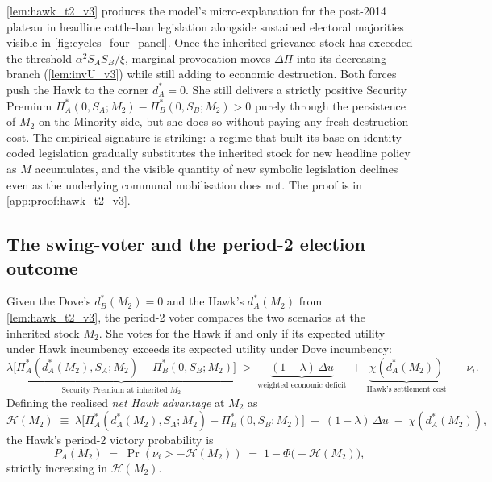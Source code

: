 \documentclass[11pt,twoside]{extarticle}
\begin{document}
\autoref{lem:hawk_t2_v3} produces the model's micro-explanation for the post-2014 plateau in headline cattle-ban legislation alongside sustained electoral majorities visible in \autoref{fig:cycles_four_panel}. Once the inherited grievance stock has exceeded the threshold $\alpha^2 S_A S_B/\xi$, marginal provocation moves $\Delta\Pi$ into its decreasing branch (\autoref{lem:invU_v3}) while still adding to economic destruction. Both forces push the Hawk to the corner $d_A^*=0$. She still delivers a strictly positive Security Premium $\Pi_A^*(0,S_A;M_2)-\Pi_B^*(0,S_B;M_2)>0$ purely through the persistence of $M_2$ on the Minority side, but she does so without paying any fresh destruction cost. The empirical signature is striking: a regime that built its base on identity-coded legislation gradually substitutes the inherited stock for new headline policy as $M$ accumulates, and the visible quantity of new symbolic legislation declines even as the underlying communal mobilisation does not. The proof is in \autoref{app:proof:hawk_t2_v3}.

\subsection{The swing-voter and the period-2 election outcome}\label{subsec:swing_v3}

Given the Dove's $d_B^*(M_2)=0$ and the Hawk's $d_A^*(M_2)$ from \autoref{lem:hawk_t2_v3}, the period-2 voter compares the two scenarios at the inherited stock $M_2$. She votes for the Hawk if and only if its expected utility under Hawk incumbency exceeds its expected utility under Dove incumbency:
\begin{equation}\label{eq:vote_HA_v3}
    \underbrace{\lambda\big[\Pi_A^*(d_A^*(M_2),S_A;M_2)-\Pi_B^*(0,S_B;M_2)\big]}_{\text{Security Premium at inherited }M_2}\;>\;\underbrace{(1-\lambda)\,\Delta u}_{\text{weighted economic deficit}}\;+\;\underbrace{\chi(d_A^*(M_2))}_{\text{Hawk's settlement cost}}\;-\;\nu_i.
\end{equation}
Defining the realised \emph{net Hawk advantage} at $M_2$ as
\begin{equation}\label{eq:net_advantage_v3}
    \mathcal H(M_2)\;\equiv\;\lambda\big[\Pi_A^*(d_A^*(M_2),S_A;M_2)-\Pi_B^*(0,S_B;M_2)\big]\;-\;(1-\lambda)\,\Delta u\;-\;\chi(d_A^*(M_2)),
\end{equation}
the Hawk's period-2 victory probability is
\begin{equation}\label{eq:Hawk_win_t2_v3}
    P_A(M_2)\;=\;\Pr(\nu_i>-\mathcal H(M_2))\;=\;1-\Phi\big(-\mathcal H(M_2)\big),
\end{equation}
strictly increasing in $\mathcal H(M_2)$.
\end{document}
